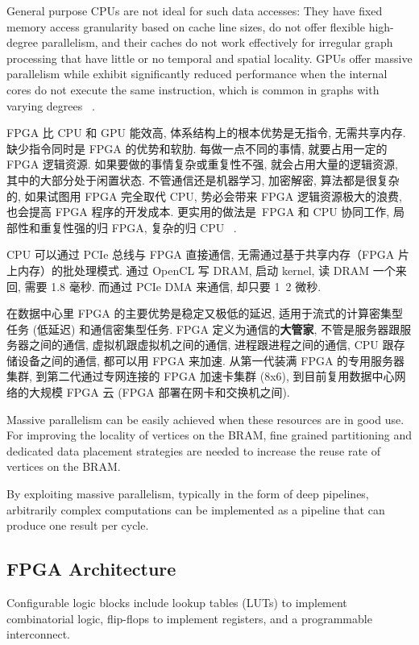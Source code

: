 \documentclass[UTF8,12pt,a4paper]{article}
\begin{document}
General purpose CPUs are not ideal for such data accesses:
They have fixed memory access granularity based on cache line sizes,
do not offer flexible high-degree parallelism,
and their caches do not work effectively for irregular graph processing
that have little or no temporal and spatial locality.
GPUs offer massive parallelism
while exhibit significantly reduced performance
when the internal cores do not execute the same instruction,
which is common in graphs with varying degrees
~\cite{DBLP:journals/corr/abs-1903-06697}.

FPGA 比 CPU 和 GPU 能效高, 体系结构上的根本优势是无指令, 无需共享内存.
缺少指令同时是 FPGA 的优势和软肋. 每做一点不同的事情, 就要占用一定的 FPGA 逻辑资源.
如果要做的事情复杂或重复性不强, 就会占用大量的逻辑资源, 其中的大部分处于闲置状态.
不管通信还是机器学习, 加密解密, 算法都是很复杂的,
如果试图用 FPGA 完全取代 CPU, 势必会带来 FPGA 逻辑资源极大的浪费, 也会提高 FPGA 程序的开发成本.
更实用的做法是 FPGA 和 CPU 协同工作, 局部性和重复性强的归 FPGA, 复杂的归 CPU
~\cite{DBLP:conf/isca/Putnam14}.

CPU 可以通过 PCIe 总线与 FPGA 直接通信, 无需通过基于共享内存（FPGA 片上内存）的批处理模式.
通过 OpenCL 写 DRAM, 启动 kernel, 读 DRAM 一个来回, 需要 1.8 毫秒.
而通过 PCIe DMA 来通信, 却只要 1~2 微秒.

在数据中心里 FPGA 的主要优势是稳定又极低的延迟, 适用于流式的计算密集型任务 (低延迟) 和通信密集型任务.
FPGA 定义为通信的\textbf{大管家}, 不管是服务器跟服务器之间的通信, 虚拟机跟虚拟机之间的通信,
进程跟进程之间的通信, CPU 跟存储设备之间的通信, 都可以用 FPGA 来加速.
从第一代装满 FPGA 的专用服务器集群, 到第二代通过专网连接的 FPGA 加速卡集群 (8x6),
到目前复用数据中心网络的大规模 FPGA 云 (FPGA 部署在网卡和交换机之间).

Massive parallelism can be easily achieved when these resources are in good use.
For improving the locality of vertices on the BRAM,
fine grained partitioning and dedicated data placement strategies
are needed to increase the reuse rate of vertices on the BRAM.

By exploiting massive parallelism, typically in the form of deep pipelines,
arbitrarily complex computations can be implemented as a pipeline
that can produce one result per cycle.

\subsection{FPGA Architecture}
Configurable logic blocks include lookup tables (LUTs) to implement combinatorial logic,
flip-flops to implement registers, and a programmable interconnect.
\end{document}
